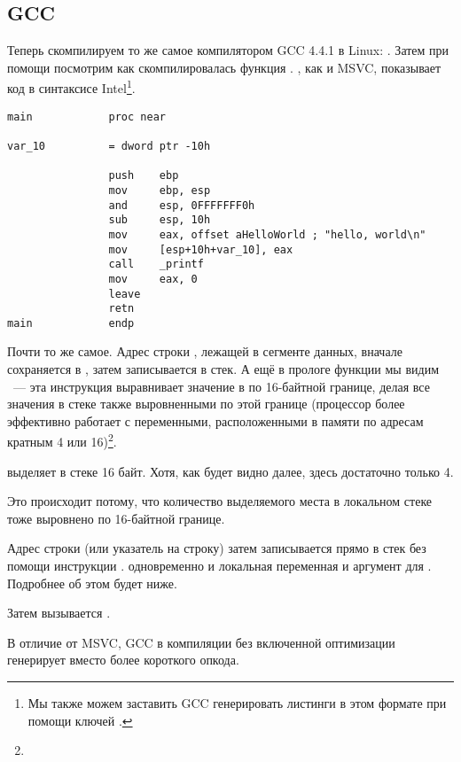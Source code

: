 \subsection{GCC}

Теперь скомпилируем то же самое компилятором GCC 4.4.1 в Linux: .
Затем при помощи \IDA посмотрим как скомпилировалась функция \main.
\IDA, как и MSVC, показывает код в синтаксисе Intel\footnote{Мы также можем заставить GCC генерировать листинги в этом формате при помощи ключей .}.

\begin{lstlisting}[caption=код в \IDA]
main            proc near

var_10          = dword ptr -10h

                push    ebp
                mov     ebp, esp
                and     esp, 0FFFFFFF0h
                sub     esp, 10h
                mov     eax, offset aHelloWorld ; "hello, world\n"
                mov     [esp+10h+var_10], eax
                call    _printf
                mov     eax, 0
                leave
                retn
main            endp
\end{lstlisting}

Почти то же самое. 
Адрес строки , лежащей в сегменте данных, вначале сохраняется в \EAX, затем записывается в стек.
А ещё в прологе функции мы видим ~--- 
эта инструкция выравнивает значение в \ESP по 16-байтной границе, делая все значения 
в стеке также выровненными по этой границе (процессор более эффективно работает с переменными, расположенными
в памяти по адресам кратным 4 или 16)\footnote{\URLWPDA}.

 выделяет в стеке 16 байт. Хотя, как будет видно далее, здесь достаточно только 4.

Это происходит потому, что количество выделяемого места в локальном стеке тоже выровнено по 16-байтной границе.

Адрес строки (или указатель на строку) затем записывается прямо в стек без помощи инструкции \PUSH.
 одновременно и локальная переменная и аргумент для \printf{}. Подробнее об этом будет ниже.

Затем вызывается \printf.

В отличие от MSVC, GCC в компиляции без включенной оптимизации генерирует  вместо более короткого опкода.

